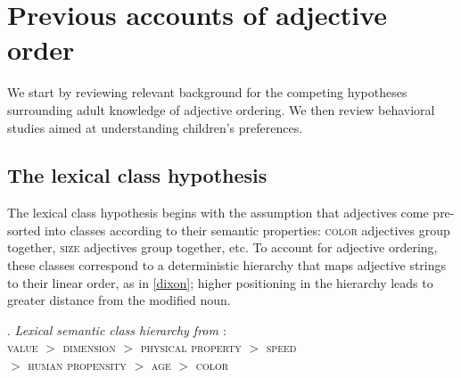\documentclass[10pt]{article}
\begin{document}

\section{Previous accounts of adjective order}
\label{sec:background}

We start by reviewing relevant background for the competing hypotheses surrounding adult knowledge of adjective ordering. We then review behavioral studies aimed at understanding children's preferences. 

\subsection{The lexical class hypothesis}
The lexical class hypothesis begins with the assumption that adjectives come pre-sorted into classes according to their semantic properties: \textsc{color} adjectives group together, \textsc{size} adjectives group together, etc. To account for adjective ordering, these classes correspond to a deterministic hierarchy that maps adjective strings to their linear order, as in \ref{dixon}; higher positioning in the hierarchy leads to greater distance from the modified noun. 

\ex. \label{dixon}
\emph{Lexical semantic class hierarchy from \cite{dixon1982}}:\\
\textsc{value} $>$ \textsc{dimension} $>$ \textsc{physical property} $>$ \textsc{speed} \\
$>$ \textsc{human propensity} $>$ \textsc{age} $>$ \textsc{color}
\end{document}
